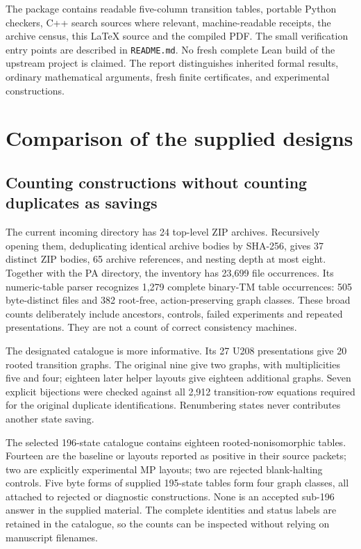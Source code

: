 \documentclass[11pt,a4paper]{article}
\newcommand{\file}[1]{\texttt{\nolinkurl{#1}}}
\begin{document}
The package contains readable five-column transition tables, portable
Python checkers, C++ search sources where relevant, machine-readable
receipts, the archive census, this \LaTeX{} source and the compiled PDF.
The small verification entry points are described in \file{README.md}.
No fresh complete Lean build of the upstream project is claimed. The report
distinguishes inherited formal results, ordinary mathematical arguments,
fresh finite certificates, and experimental constructions.

\section{Comparison of the supplied designs}
\label{sec:comparison}

\subsection{Counting constructions without counting duplicates as savings}

The current incoming directory has 24 top-level ZIP archives. Recursively
opening them, deduplicating identical archive bodies by SHA-256, gives 37
distinct ZIP bodies, 65 archive references, and nesting depth at most eight.
Together with the PA directory, the inventory has 23,699 file occurrences.
Its numeric-table parser recognizes 1,279 complete binary-TM table
occurrences: 505 byte-distinct files and 382 root-free, action-preserving
graph classes. These broad counts deliberately include ancestors, controls,
failed experiments and repeated presentations. They are not a count of
correct consistency machines.

The designated catalogue is more informative. Its 27 U208 presentations
give 20 rooted transition graphs. The original nine give two graphs, with
multiplicities five and four; eighteen later helper layouts give eighteen
additional graphs. Seven explicit bijections were checked against all
2,912 transition-row equations required for the original duplicate
identifications. Renumbering states never contributes another state saving.

The selected 196-state catalogue contains eighteen rooted-nonisomorphic
tables. Fourteen are the baseline or layouts reported as positive in their
source packets; two are explicitly experimental MP layouts; two are
rejected blank-halting controls. Five byte forms of supplied 195-state
tables form four graph classes, all attached to rejected or diagnostic
constructions. None is an accepted sub-196 answer in the supplied material.
The complete identities and status labels are retained in the catalogue,
so the counts can be inspected without relying on manuscript filenames.
\end{document}
